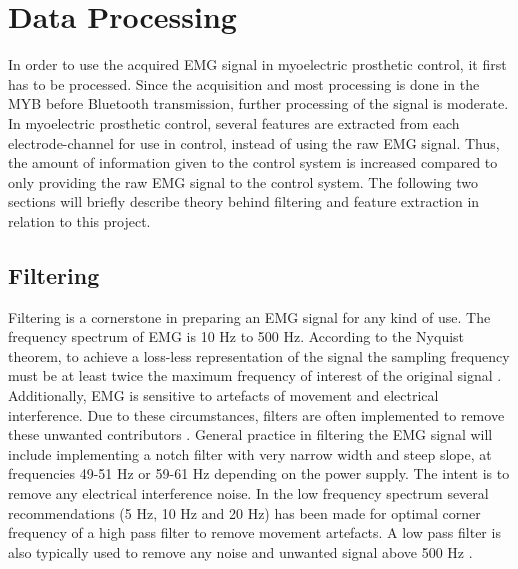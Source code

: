 \section{Data Processing} \label{sec:BG:dataProcessing}


In order to use the acquired EMG signal in myoelectric prosthetic control, it first has to be processed. %
Since the acquisition and most processing is done in the MYB before Bluetooth transmission, further processing of the signal is moderate. In myoelectric prosthetic control, several features are extracted from each electrode-channel for use in control, instead of using the raw EMG signal. Thus, the amount of information given to the control system is increased compared to only providing the raw EMG signal to the control system. The following two sections will briefly describe theory behind filtering and feature extraction in relation to this project. 


\subsection{Filtering} \label{sub:BG:filtering} %

Filtering is a cornerstone in preparing an EMG signal for any kind of use. The frequency spectrum of EMG is 10 Hz to 500 Hz. \cite{Cram2012} According to the Nyquist theorem, to achieve a loss-less representation of the signal the sampling frequency must be at least twice the maximum frequency of interest of the original signal \cite{Pozzo2004}. Additionally, EMG is sensitive to artefacts of movement and electrical interference. Due to these circumstances, filters are often implemented to remove these unwanted contributors \cite{DeLuca2010}. 
General practice in filtering the EMG signal will include implementing a notch filter with very narrow width and steep slope, at frequencies 49-51 Hz or 59-61 Hz depending on the power supply. The intent is to remove any electrical interference noise. In the low frequency spectrum several recommendations (5 Hz, 10 Hz and 20 Hz) has been made for optimal corner frequency of a high pass filter to remove movement artefacts. A low pass filter is also typically used to remove any noise and unwanted signal above 500 Hz \cite{Cram2012}. 

